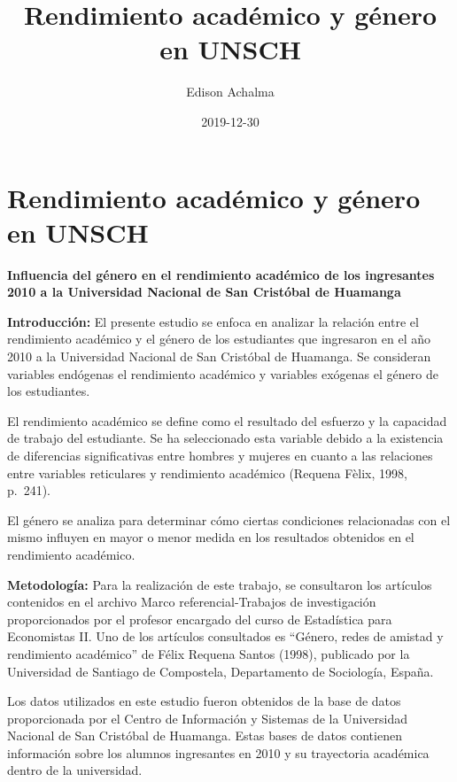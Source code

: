 \documentclass[
  jou,
  floatsintext,
  longtable,
  a4paper,
  nolmodern,
  notxfonts,
  notimes,
  12pt,
  colorlinks=true,linkcolor=blue,citecolor=blue,urlcolor=blue]{apa7}
\title{Rendimiento académico y género en UNSCH}
\author{Edison Achalma}
\affiliation{
{Escuela Profesional de Economía, Universidad Nacional de San Cristóbal
de Huamanga}}
\date{2019-12-30}
\begin{document}
\maketitle


\hypertarget{toc}{}
\tableofcontents
\newpage
\section[Introduction]{Rendimiento académico y género en UNSCH}

\setcounter{secnumdepth}{3}

\setlength\LTleft{0pt}




\textbf{Influencia del género en el rendimiento académico de los
ingresantes 2010 a la Universidad Nacional de San Cristóbal de Huamanga}

\textbf{Introducción:} El presente estudio se enfoca en analizar la
relación entre el rendimiento académico y el género de los estudiantes
que ingresaron en el año 2010 a la Universidad Nacional de San Cristóbal
de Huamanga. Se consideran variables endógenas el rendimiento académico
y variables exógenas el género de los estudiantes.

El rendimiento académico se define como el resultado del esfuerzo y la
capacidad de trabajo del estudiante. Se ha seleccionado esta variable
debido a la existencia de diferencias significativas entre hombres y
mujeres en cuanto a las relaciones entre variables reticulares y
rendimiento académico (Requena Fèlix, 1998, p.~241).

El género se analiza para determinar cómo ciertas condiciones
relacionadas con el mismo influyen en mayor o menor medida en los
resultados obtenidos en el rendimiento académico.

\textbf{Metodología:} Para la realización de este trabajo, se
consultaron los artículos contenidos en el archivo Marco
referencial-Trabajos de investigación proporcionados por el profesor
encargado del curso de Estadística para Economistas II. Uno de los
artículos consultados es ``Género, redes de amistad y rendimiento
académico'' de Félix Requena Santos (1998), publicado por la Universidad
de Santiago de Compostela, Departamento de Sociología, España.

Los datos utilizados en este estudio fueron obtenidos de la base de
datos proporcionada por el Centro de Información y Sistemas de la
Universidad Nacional de San Cristóbal de Huamanga. Estas bases de datos
contienen información sobre los alumnos ingresantes en 2010 y su
trayectoria académica dentro de la universidad.
\end{document}
